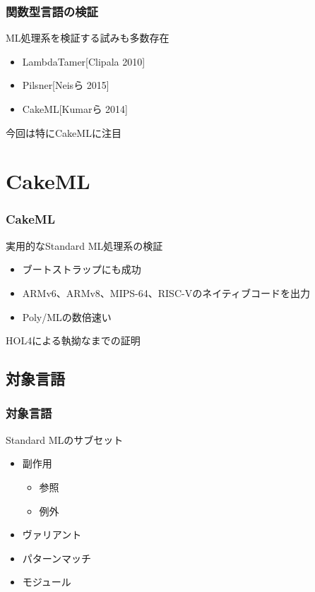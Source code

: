 \documentclass[dvipdfmx,cjk,xcolor=dvipsnames,envcountsect,notheorems,12pt]{beamer}
\theoremstyle{definition}
\begin{document}
\begin{frame}
	\frametitle{関数型言語の検証}
	\Large
	ML処理系を検証する試みも多数存在

	\begin{itemize}
		\item LambdaTamer[Clipala 2010]
		\item Pilsner[Neisら 2015]
		\item CakeML[Kumarら 2014]
	\end{itemize}

	\vfill

	今回は特にCakeMLに注目
\end{frame}

\section{CakeML}
\begin{frame}
	\frametitle{CakeML}
	\Large
	実用的なStandard ML処理系の検証
	\begin{itemize}
		\item ブートストラップにも成功
		\item ARMv6、ARMv8、MIPS-64、RISC-Vのネイティブコードを出力
		\item Poly/MLの数倍速い
	\end{itemize}

	HOL4による執拗なまでの証明
\end{frame}

\subsection{対象言語}

\begin{frame}
	\frametitle{対象言語}
	\Large
	Standard MLのサブセット
	\begin{itemize}
		\item 副作用
			\begin{itemize}
				\item 参照
				\item 例外
			\end{itemize}
		\item ヴァリアント
		\item パターンマッチ
		\item モジュール
	\end{itemize}
\end{frame}
\end{document}
